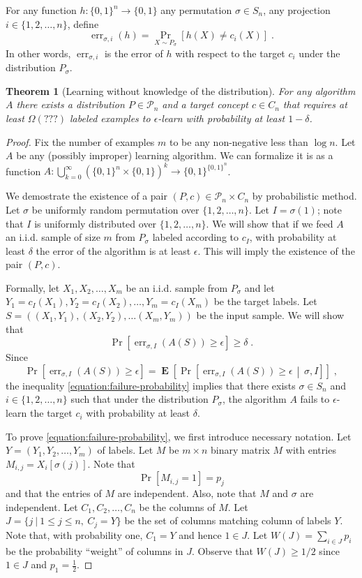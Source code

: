 \documentclass[10pt]{article}
\newtheorem{theorem}[proposition]{Theorem}
\renewcommand{\P}{\mathcal{P}}
\DeclareMathOperator{\err}{err}
\DeclareMathOperator{\Exp}{\mathbf{E}}
\begin{document}
For any function $h:\{0,1\}^n \to \{0,1\}$ any permutation $\sigma \in S_n$, any
projection $i \in \{1,2,\dots,n\}$, define
$$
\err_{\sigma,i}(h) = \Pr_{X \sim P_{\sigma}}[h(X) \neq c_i(X)] \; .
$$
In other words, $\err_{\sigma,i}$ is the error of $h$ with respect to the target
$c_i$ under the distribution $P_{\sigma}$.

\begin{theorem}[Learning without knowledge of the distribution]
For any algorithm $A$ there exists a distribution $P \in \P_n$
and a target concept $c \in C_n$ that requires at least $\Omega \left(??? \right)$
labeled examples to $\epsilon$-learn with probability at least $1 - \delta$.
\end{theorem}

\begin{proof}
Fix the number of examples $m$ to be any non-negative less than $\log n$. Let $A$
be any (possibly improper) learning algorithm. We can formalize it is as a
function $A:\bigcup_{k=0}^\infty (\{0,1\}^n \times \{0,1\})^k \to
\{0,1\}^{\{0,1\}^n}$.

We demostrate the existence of a pair $(P,c) \in \P_n \times C_n$ by
probabilistic method. Let $\sigma$ be uniformly random permutation over
$\{1,2,\dots,n\}$. Let $I = \sigma(1)$; note that $I$ is uniformly distributed
over $\{1,2,\dots,n\}$. We will show that if we feed $A$ an i.i.d. sample of
size $m$ from $P_\sigma$ labeled according to $c_I$, with probability at least
$\delta$ the error of the algorithm is at least $\epsilon$. This will imply
the existence of the pair $(P,c)$.

Formally, let $X_1, X_2, \dots, X_m$ be an i.i.d. sample from $P_{\sigma}$ and
let $Y_1 = c_I(X_1), Y_2 = c_I(X_2), \dots, Y_m = c_I(X_m)$ be the target labels.
Let $S = ((X_1, Y_1), (X_2, Y_2), \dots (X_m, Y_m))$ be the input sample.
We will show that
\begin{equation}
\label{equation:failure-probability}
\Pr \left[\err_{\sigma,I}(A(S)) \ge \epsilon \right] \ge \delta \; .
\end{equation}
Since
$$
\Pr \left[\err_{\sigma,I}(A(S)) \ge \epsilon \right] = \Exp\left[ \Pr \left[\err_{\sigma,I}(A(S)) \ge \epsilon \, \middle| \, \sigma, I \right] \right] \; ,
$$
the inequality \eqref{equation:failure-probability} implies that there
exists $\sigma \in S_n$ and $i \in \{1,2,\dots,n\}$ such that under the
distribution $P_\sigma$, the algorithm $A$ fails to $\epsilon$-learn the target
$c_i$ with probability at least $\delta$.

To prove \eqref{equation:failure-probability}, we first introduce
necessary notation. Let $Y = (Y_1, Y_2, \dots, Y_m)$ of labels.
Let $M$ be $m \times n$ binary matrix $M$ with entries
$M_{i,j} = X_i[\sigma(j)]$. Note that
$$
\Pr[M_{i,j} = 1] = p_j
$$
and that the entries of $M$ are independent. Also, note that $M$ and $\sigma$
are independent. Let $C_1, C_2, \dots, C_n$ be the columns of $M$. Let $J = \{ j ~|~
1 \le j \le n, \ C_j = Y \}$ be the set of columns matching column of labels
$Y$. Note that, with probability one, $C_1 = Y$ and hence $1 \in J$.
Let $W(J) = \sum_{i \in J} p_i$ be the probability ``weight'' of columns in $J$.
Observe that $W(J) \ge 1/2$ since $1 \in J$ and $p_1 = \frac{1}{2}$.


\end{proof}
\end{document}
